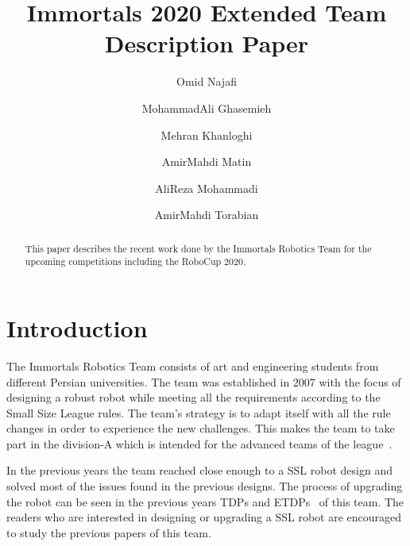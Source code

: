 \documentclass[runningheads]{llncs}
\begin{document}
%
\title{Immortals 2020 Extended Team Description Paper}
%
%
\author{Omid Najafi \and
MohammadAli Ghasemieh \and
Mehran Khanloghi \and
AmirMahdi Matin \and
AliReza Mohammadi \and
AmirMahdi Torabian}
%
%
%
\maketitle              %
%
\begin{abstract}
This paper describes the recent work done by the Immortals Robotics Team for the upcoming competitions including the RoboCup 2020.

\end{abstract}
%
%
%
\section{Introduction}
The Immortals Robotics Team consists of art and engineering students from different Persian universities.
The team was established in 2007 with the focus of designing a robust robot while meeting all the requirements according to the Small Size League rules. The team's strategy is to adapt itself with all the rule changes in order to experience the new challenges. This makes the team to take part in the division-A which is intended for the advanced teams of the league~\cite{ref_website}.

In the previous years the team reached close enough to a SSL robot design and solved most of the issues found in the previous designs. The process of upgrading the robot can be seen in the previous years TDPs and ETDPs~\cite{ref_ETDP2019} of this team. The readers who are interested in designing or upgrading a SSL robot are encouraged to study the previous papers of this team.
\end{document}
